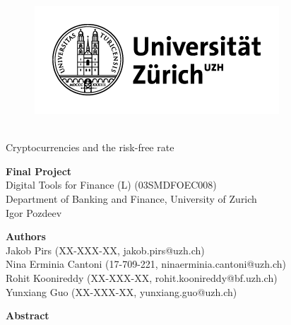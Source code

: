 \thispagestyle{empty}


\begin{figure}[!h]
\centering
\includegraphics{images/uzh_logo.pdf}\\\
\end{figure}
\vspace{1cm}

\begin{center}
\huge {Cryptocurrencies and the risk-free rate}
\end{center}
\vspace{1cm}

\begin{center}
\large \textbf{Final Project}\\
\vspace{0.5cm}
Digital Tools for Finance (L) (03SMDFOEC008)\\
Department of Banking and Finance, University of Zurich\\
Igor Pozdeev
\end{center}
\vspace{1cm}

\begin{center}
\large \textbf{Authors}\\
\vspace{0.5cm}
Jakob Pirs (XX-XXX-XX, jakob.pirs@uzh.ch)\\

Nina Erminia Cantoni (17-709-221, ninaerminia.cantoni@uzh.ch)\\

Rohit Koonireddy (XX-XXX-XX, rohit.koonireddy@bf.uzh.ch)\\

Yunxiang Guo (XX-XXX-XX, yunxiang.guo@uzh.ch)\\
\end{center}
\vspace{1cm}

\begin{center}
\large \textbf{Abstract}\\
\vspace{0.5cm}
\begin{justify}

\end{justify}
\end{center}
\vspace{1cm}


